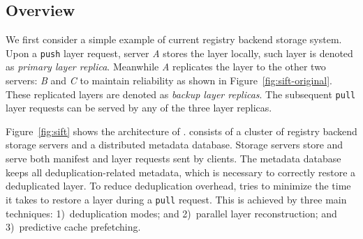 \subsection{Overview}
\label{sec:overview}


%


We first consider  a simple example of current registry backend storage system.
Upon a \texttt{push} layer request,
server \emph{A} stores the layer locally, such layer is denoted as \emph{primary layer replica}.
Meanwhile \emph{A} replicates the layer to the other two servers: 
\emph{B} and \emph{C} to maintain reliability as shown in Figure~\ref{fig:sift-original}. 
These replicated layers are denoted as \emph{backup layer replicas}.
The subsequent \texttt{pull} layer requests can be served by 
any of the three layer replicas.%

Figure~\ref{fig:sift} shows the architecture of \sysname.
\sysname consists of a cluster of registry backend storage servers and a distributed metadata database. 
Storage servers store and serve both manifest and layer requests sent by clients. The
metadata database keeps all deduplication-related metadata, which is necessary to correctly restore
a deduplicated layer.
%
To reduce deduplication overhead, \sysname tries to minimize the time it takes to restore a layer
during a \texttt{pull} request. This is achieved by three main techniques: 1)~deduplication modes;
and 2)~parallel layer reconstruction; and 3)~predictive cache prefetching.

